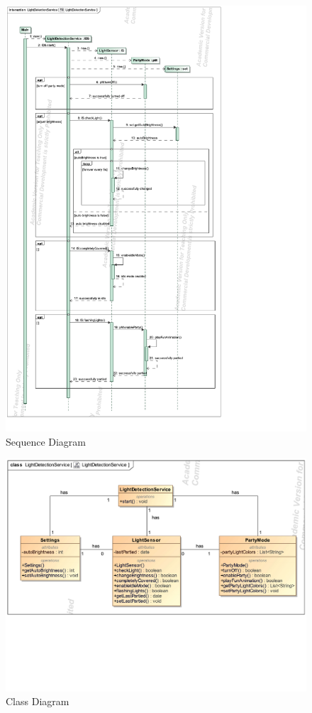 \documentclass{article}
\begin{document}
		\clearpage
		\begin{figure}[h!]
			\centering
			\captionsetup{labelformat=empty}
			\caption{Sequence Diagram}
		    	\includegraphics[scale=0.78, angle=0]{Marc/light/LightDetectionServiceSequence.pdf}
		\end{figure}
		\clearpage
		\begin{figure}[h!]
			\centering
			\captionsetup{labelformat=empty}
			\caption{Class Diagram}
		    	\includegraphics[width=\textwidth, angle=0]{Marc/light/LightDetectionServiceClass.pdf}
		\end{figure}
		\clearpage	
\end{document}
